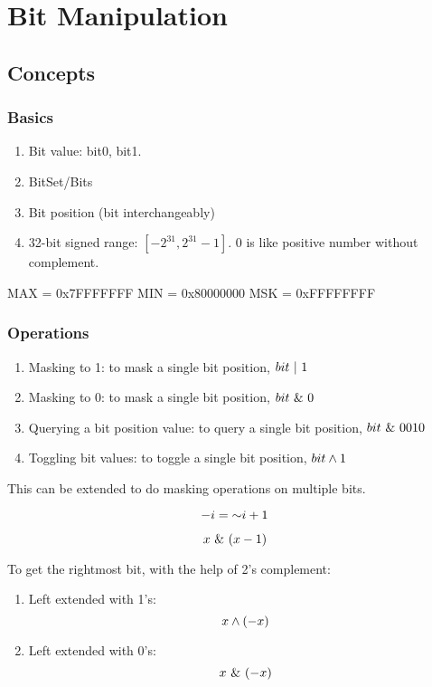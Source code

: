 \chapter{Bit Manipulation}
\section{Concepts}
\subsection{Basics}
\begin{enumerate}
\item Bit value: bit0, bit1. 
\item BitSet/Bits
\item Bit position (bit interchangeably)
\item 32-bit signed range: $[-2^{31}, 2^{31}-1]$. $0$ is like positive number without complement. 
\end{enumerate}
\begin{python}
MAX = 0x7FFFFFFF
MIN = 0x80000000
MSK = 0xFFFFFFFF
\end{python}
\subsection{Operations}
\begin{enumerate}
\item Masking to 1: to mask a single bit position, $bit\ |\  1$
\item Masking to 0: to mask a single bit position, $bit\ \&\  0$
\item Querying a bit position value: to query a single bit position, $bit\ \&\  0010$
\item Toggling bit values: to toggle a single bit position, $bit\wedge 1$
\end{enumerate}
This can be extended to do masking operations on multiple bits. 

$$
-i = \mathord{\sim} i+1
$$

$$x\ \&\ (x-1)$$

 To get the rightmost bit, with the help of 2's complement:
\begin{enumerate}
\item Left extended with 1's:
$$x \wedge (-x)$$
\item Left extended with 0's:
$$x \ \&\  (-x)$$
\end{enumerate}


